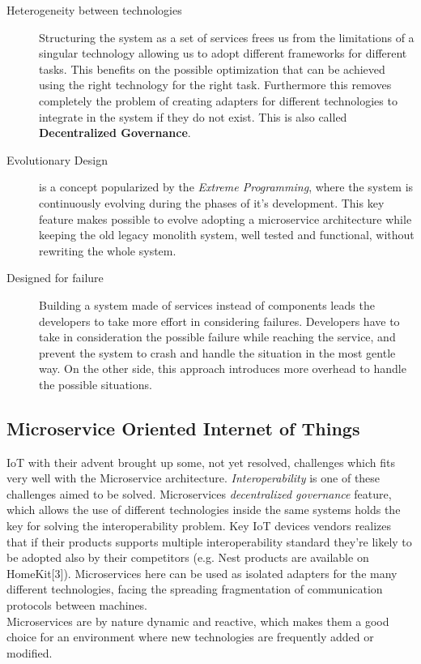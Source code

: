 \begin{description}
  \item[Heterogeneity between technologies] Structuring the system as a set
  of services frees us from the limitations of a singular technology allowing
  us to adopt different frameworks for different tasks. This benefits on the
  possible optimization that can be achieved using the right technology for the
  right task. Furthermore this removes completely the problem of creating adapters
  for different technologies to integrate in the system if they do not exist. This is
  also called \textbf{Decentralized Governance}.
  \item[Evolutionary Design] is a concept popularized by the \textit{Extreme Programming},
  where the system is continuously evolving during the phases of it's development.
  This key feature makes possible to evolve adopting a microservice architecture while
  keeping the old legacy monolith system, well tested and functional, without rewriting
  the whole system.
  \item[Designed for failure] Building a system made of services instead of components
  leads the developers to take more effort in considering failures. Developers have
  to take in consideration the possible failure while reaching the service, and
  prevent the system to crash and handle the situation in the most gentle way. On the
  other side, this approach introduces more overhead to handle the possible situations.


\end{description}


\subsection{Microservice Oriented Internet of Things}
IoT with their advent brought up some, not yet resolved, challenges which fits
very well with the Microservice architecture. \textit{Interoperability} is one of these
challenges aimed to be solved. Microservices \textit{decentralized governance} feature,
which allows the use of different technologies inside the same systems holds the key for
solving the interoperability problem. Key IoT devices vendors realizes that if their products
supports multiple interoperability standard they're likely to be adopted also by their
competitors (e.g. Nest products are available on HomeKit[3]). Microservices here can be
used as isolated adapters for the many different technologies, facing the spreading
fragmentation of communication protocols between machines.\\
Microservices are by nature dynamic and reactive, which makes them a good choice for
an environment where new technologies are frequently added or modified.

